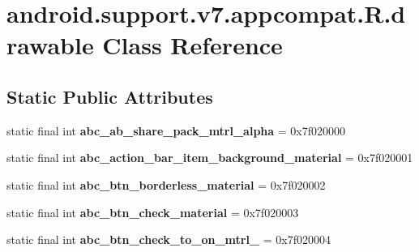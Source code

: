 \hypertarget{classandroid_1_1support_1_1v7_1_1appcompat_1_1_r_1_1drawable}{}\section{android.\+support.\+v7.\+appcompat.\+R.\+drawable Class Reference}
\label{classandroid_1_1support_1_1v7_1_1appcompat_1_1_r_1_1drawable}
\subsection*{Static Public Attributes}
\begin{DoxyCompactItemize}
\item 
\hypertarget{classandroid_1_1support_1_1v7_1_1appcompat_1_1_r_1_1drawable_a2617cd3cc5fd99bf8702673e973c716d}{}static final int {\bfseries abc\+\_\+ab\+\_\+share\+\_\+pack\+\_\+mtrl\+\_\+alpha} = 0x7f020000\label{classandroid_1_1support_1_1v7_1_1appcompat_1_1_r_1_1drawable_a2617cd3cc5fd99bf8702673e973c716d}

\item 
\hypertarget{classandroid_1_1support_1_1v7_1_1appcompat_1_1_r_1_1drawable_a48cb66511eb88f80686a25611e677bd3}{}static final int {\bfseries abc\+\_\+action\+\_\+bar\+\_\+item\+\_\+background\+\_\+material} = 0x7f020001\label{classandroid_1_1support_1_1v7_1_1appcompat_1_1_r_1_1drawable_a48cb66511eb88f80686a25611e677bd3}

\item 
\hypertarget{classandroid_1_1support_1_1v7_1_1appcompat_1_1_r_1_1drawable_ad3b42c47b3c3ed014fd375136c62b76b}{}static final int {\bfseries abc\+\_\+btn\+\_\+borderless\+\_\+material} = 0x7f020002\label{classandroid_1_1support_1_1v7_1_1appcompat_1_1_r_1_1drawable_ad3b42c47b3c3ed014fd375136c62b76b}

\item 
\hypertarget{classandroid_1_1support_1_1v7_1_1appcompat_1_1_r_1_1drawable_ad54104f0bfce1e7c5fa5f887c153557a}{}static final int {\bfseries abc\+\_\+btn\+\_\+check\+\_\+material} = 0x7f020003\label{classandroid_1_1support_1_1v7_1_1appcompat_1_1_r_1_1drawable_ad54104f0bfce1e7c5fa5f887c153557a}

\item 
\hypertarget{classandroid_1_1support_1_1v7_1_1appcompat_1_1_r_1_1drawable_a45c3ee07ad24f689749d83dccb1efe64}{}static final int {\bfseries abc\+\_\+btn\+\_\+check\+\_\+to\+\_\+on\+\_\+mtrl\+\_} = 0x7f020004\label{classandroid_1_1support_1_1v7_1_1appcompat_1_1_r_1_1drawable_a45c3ee07ad24f689749d83dccb1efe64}


\end{DoxyCompactItemize}
